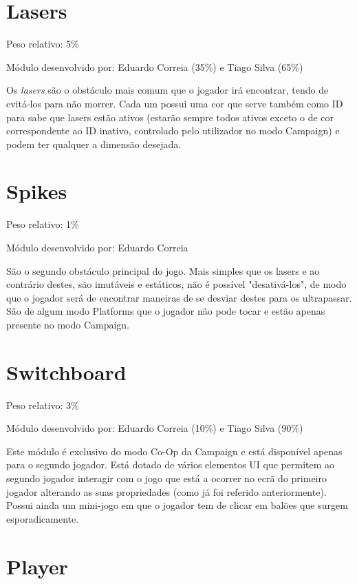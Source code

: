 \documentclass{report}
\begin{document}
\section{Lasers}

Peso relativo: 5\%

Módulo desenvolvido por: Eduardo Correia (35\%) e Tiago Silva (65\%)
\newline

Os \textit{lasers} são o obstáculo mais comum que o jogador irá encontrar, tendo de evitá-los para não morrer. Cada um possui uma cor que serve também como ID para sabe que lasers estão ativos (estarão sempre todos ativos exceto o de cor correspondente ao ID inativo, controlado pelo utilizador no modo Campaign) e podem ter qualquer a dimensão desejada. 

\section{Spikes}

Peso relativo: 1\%

Módulo desenvolvido por: Eduardo Correia
\newline

São o segundo obstáculo principal do jogo. Mais simples que os lasers e ao contrário destes, são imutáveis e estáticos, não é possível "desativá-los", de modo que o jogador será de encontrar maneiras de se desviar destes para os ultrapassar. São de algum modo Platforms que o jogador não pode tocar e estão apenas presente no modo Campaign.

\section{Switchboard}

Peso relativo: 3\%

Módulo desenvolvido por: Eduardo Correia (10\%) e Tiago Silva (90\%)
\newline

Este módulo é exclusivo do modo Co-Op da Campaign e está disponível apenas para o segundo jogador. Está dotado de vários elementos UI que permitem ao segundo jogador interagir com o jogo que está a ocorrer no ecrã do primeiro jogador alterando as suas propriedades (como já foi referido anteriormente).
Possui ainda um mini-jogo em que o jogador tem de clicar em balões que surgem esporadicamente.

\section{Player}
\end{document}

